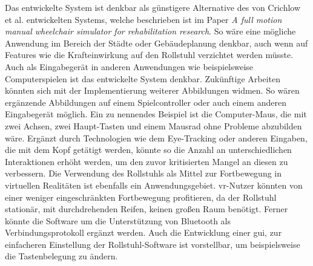 Das entwickelte System ist denkbar als günstigere Alternative des von Crichlow et al. entwickelten Systems, welche beschrieben ist im Paper \textit{A full motion manual wheelchair simulator for rehabilitation research}\cite{crichlowFullMotionManual2011}.
So wäre eine mögliche Anwendung im Bereich der Städte oder Gebäudeplanung denkbar, auch wenn auf Features wie die Krafteinwirkung auf den Rollstuhl verzichtet werden müsste.
Auch als Eingabegerät in anderen Anwendungen wie beispielsweise Computerspielen ist das entwickelte System denkbar.
Zukünftige Arbeiten könnten sich mit der Implementierung weiterer Abbildungen widmen.
So wären ergänzende Abbildungen auf einem Spielcontroller oder auch einem anderen Eingabegerät möglich.
Ein zu nennendes Beispiel ist die Computer-Maus, die mit zwei Achsen, zwei Haupt-Tasten und einem Mausrad ohne Probleme abzubilden wäre.
Ergänzt durch Technologien wie dem Eye-Tracking oder anderen Eingaben, die mit dem Kopf getätigt werden, könnte so die Anzahl an unterschiedlichen Interaktionen erhöht werden, um den zuvor kritisierten Mangel an diesen zu verbessern.
Die Verwendung des Rollstuhls als Mittel zur Fortbewegung in virtuellen Realitäten ist ebenfalls ein Anwendungsgebiet.
\ac{vr}-Nutzer könnten von einer weniger eingeschränkten Fortbewegung profitieren, da der Rollstuhl stationär, mit durchdrehenden Reifen, keinen großen Raum benötigt.
Ferner könnte die Software um die Unterstützung von Bluetooth als Verbindungsprotokoll ergänzt werden.
Auch die Entwicklung einer \ac{gui}, zur einfacheren Einstellung der Rollstuhl-Software ist vorstellbar, um beispielsweise die Tastenbelegung zu ändern.